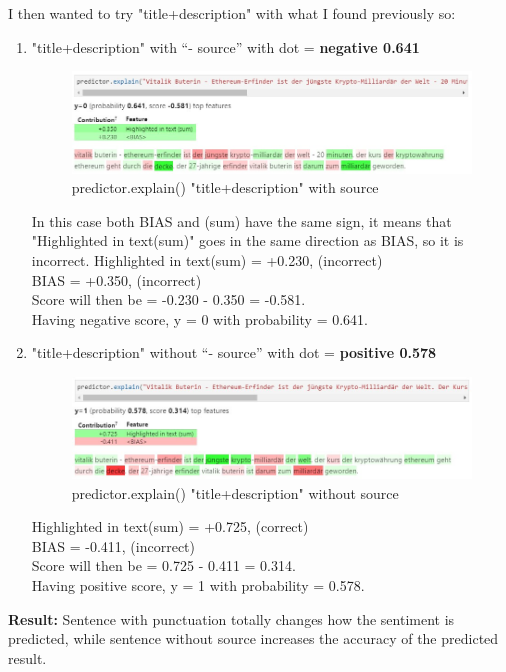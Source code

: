 I then wanted to try "title+description" with what I found previously so:
\begin{enumerate}
    \item "title+description" with “- source” with dot = \textbf{negative 0.641}
        \begin{figure}[H]
\centering
\includegraphics[width=1\textwidth]{images/5text.jpg}
\caption{predictor.explain() "title+description" with source}
\label{fig:fig_005}
\end{figure}
\FloatBarrier
In this case both BIAS and (sum) have the same sign, it means that "Highlighted in text(sum)" goes in the same direction as BIAS, so it is incorrect.
Highlighted in text(sum) = +0.230, (incorrect)\\
BIAS = +0.350, (incorrect)\\
Score will then be = -0.230 - 0.350 = -0.581.\\
Having negative score, y = 0 with probability = 0.641.
    \item "title+description" without “- source” with dot = \textbf{positive 0.578}
        \begin{figure}[H]
\centering
\includegraphics[width=1\textwidth]{images/6text.jpg}
\caption{predictor.explain() "title+description" without source}
\label{fig:fig_006}
\end{figure}
\FloatBarrier
Highlighted in text(sum) = +0.725, (correct)\\
BIAS = -0.411, (incorrect)\\
Score will then be = 0.725 - 0.411 = 0.314.\\
Having positive score, y = 1 with probability = 0.578.
\end{enumerate}

\textbf{Result:} Sentence with punctuation totally changes how the sentiment is predicted, while sentence without source increases the \gls{accuracy} of the predicted result.

